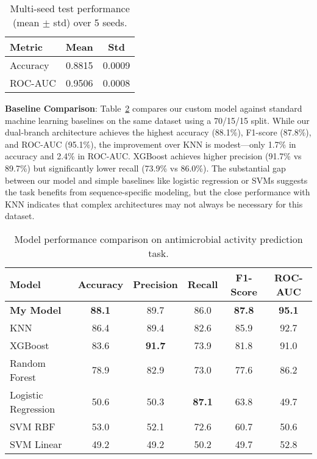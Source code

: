 \documentclass{article}
\begin{document}
\begin{table}[H]
  \centering
  \caption{Multi-seed test performance (mean $\pm$ std) over 5 seeds.}
  \label{tab:summary}
  \begin{tabular}{lcc}
    \toprule
    Metric & Mean & Std \\
    \midrule
    Accuracy & 0.8815 & 0.0009 \\
    ROC-AUC  & 0.9506 & 0.0008 \\
    \bottomrule
  \end{tabular}
\end{table}

\noindent \textbf{Baseline Comparison}: Table~\ref{tab:baselines} compares our custom model against standard machine learning baselines on the same dataset using a 70/15/15 split. While our dual-branch architecture achieves the highest accuracy (88.1\%), F1-score (87.8\%), and ROC-AUC (95.1\%), the improvement over KNN is modest—only 1.7\% in accuracy and 2.4\% in ROC-AUC. XGBoost achieves higher precision (91.7\% vs 89.7\%) but significantly lower recall (73.9\% vs 86.0\%). The substantial gap between our model and simple baselines like logistic regression or SVMs suggests the task benefits from sequence-specific modeling, but the close performance with KNN indicates that complex architectures may not always be necessary for this dataset.

\begin{table}[H]
  \centering
  \caption{Model performance comparison on antimicrobial activity prediction task.}
  \label{tab:baselines}
  \begin{tabular}{lccccc}
    \toprule
    Model & Accuracy & Precision & Recall & F1-Score & ROC-AUC \\
    \midrule
    \textbf{My Model} & \textbf{88.1} & 89.7 & 86.0 & \textbf{87.8} & \textbf{95.1} \\
    KNN & 86.4 & 89.4 & 82.6 & 85.9 & 92.7 \\
    XGBoost & 83.6 & \textbf{91.7} & 73.9 & 81.8 & 91.0 \\
    Random Forest & 78.9 & 82.9 & 73.0 & 77.6 & 86.2 \\
    Logistic Regression & 50.6 & 50.3 & \textbf{87.1} & 63.8 & 49.7 \\
    SVM RBF & 53.0 & 52.1 & 72.6 & 60.7 & 50.6 \\
    SVM Linear & 49.2 & 49.2 & 50.2 & 49.7 & 52.8 \\
    \bottomrule
  \end{tabular}
\end{table}
\end{document}
